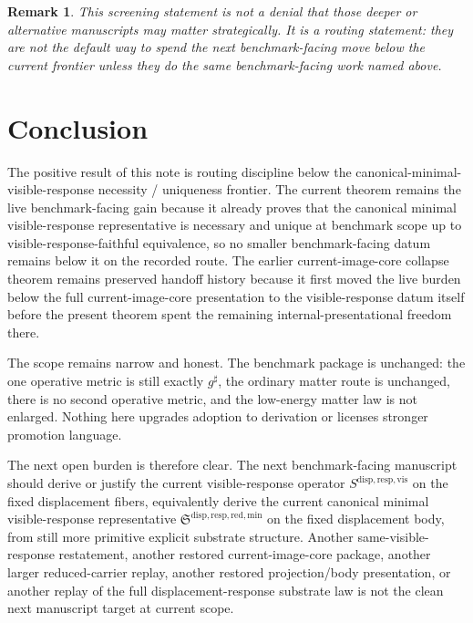 \documentclass[11pt]{article}
\newcommand{\CompletedMetric}{g^{\sharp}}
\newcommand{\VisibleResponseOperator}{S^{\mathrm{disp,resp,vis}}}
\newcommand{\MinimalReducedStructure}{\mathfrak S^{\mathrm{disp,resp,red,min}}}
\newtheorem{remark}{Remark}
\begin{document}
\begin{remark}
This screening statement is not a denial that those deeper or alternative manuscripts may matter strategically. It is a routing statement: they are not the default way to spend the next benchmark-facing move below the current frontier unless they do the same benchmark-facing work named above.
\end{remark}

\section{Conclusion}

The positive result of this note is routing discipline below the canonical-minimal-visible-response necessity / uniqueness frontier. The current theorem remains the live benchmark-facing gain because it already proves that the canonical minimal visible-response representative is necessary and unique at benchmark scope up to visible-response-faithful equivalence, so no smaller benchmark-facing datum remains below it on the recorded route. The earlier current-image-core collapse theorem remains preserved handoff history because it first moved the live burden below the full current-image-core presentation to the visible-response datum itself before the present theorem spent the remaining internal-presentational freedom there.

The scope remains narrow and honest. The benchmark package is unchanged: the one operative metric is still exactly \(\CompletedMetric\), the ordinary matter route is unchanged, there is no second operative metric, and the low-energy matter law is not enlarged. Nothing here upgrades adoption to derivation or licenses stronger promotion language.

The next open burden is therefore clear. The next benchmark-facing manuscript should derive or justify the current visible-response operator \(\VisibleResponseOperator\) on the fixed displacement fibers, equivalently derive the current canonical minimal visible-response representative \(\MinimalReducedStructure\) on the fixed displacement body, from still more primitive explicit substrate structure. Another same-visible-response restatement, another restored current-image-core package, another larger reduced-carrier replay, another restored projection/body presentation, or another replay of the full displacement-response substrate law is not the clean next manuscript target at current scope.
\end{document}
